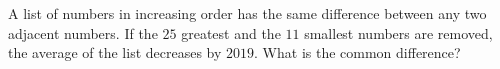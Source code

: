 A list of numbers in increasing order has the same difference between any two adjacent numbers. If the $25$ greatest and the $11$ smallest numbers are removed, the average of the list decreases by $2019$. What is the common difference?

